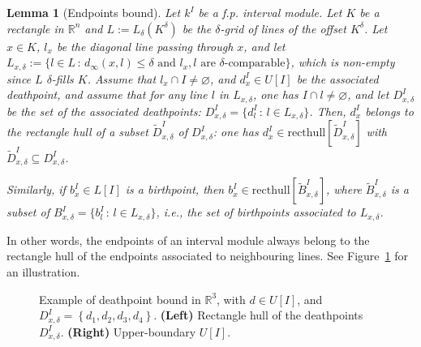 \documentclass{article}
\newcommand{\R}{\mathbb{R}}
\newcommand{\upperb}[1]{ U[#1] }
\newcommand{\lowerb}[1]{ L[#1] }
\newtheorem{lemma}[theorem]{Lemma}
\begin{document}
\begin{lemma}[Endpoints bound]\label{lemma:boundary_bound}
	Let $k^I$ be a {f.p.} interval module. Let $K$ be a rectangle in $\R^n$ and $L:=L_\delta(K^\delta)$ be the $\delta$-grid of lines of the offset $K^\delta$.
	Let $x\in K$, $l_x$ be the diagonal line passing through $x$, and let $
	L_{x,\delta}:=\{l\in L\,:\, d_\infty(x,l) \leq \delta \text{ and } l_x, l \text{ are $\delta$-comparable}\}
	$, which is non-empty since
	$L$ $\delta$-fills $K$.
	Assume that $l_x\cap I\neq \varnothing$, and $d^I_x \in \upperb{I}$ be the associated deathpoint, and
	assume that for any line $l$ in $L_{x,\delta}$, one has $I\cap l\neq \varnothing$, and
	let $D_{x,\delta}^I$ be the set of the associated deathpoints: $D_{x,\delta}^I=\{d_l^I\,:\, l\in L_{x,\delta}\}$.
	Then, $d^I_x$ belongs to the rectangle hull of a subset $\tilde
	D_{x,\delta}^I$ of $D_{x,\delta}^I$: one has $d^I_x\in \mathrm{recthull} [\tilde D_{x,\delta}^I]$ with $\tilde D_{x,\delta}^I \subseteq D_{x,\delta}^I$.

	Similarly, if $b^I_x\in \lowerb{I}$ is a birthpoint, then $b^I_x\in\mathrm{
	recthull}[\tilde B_{x,\delta}^I]$, where $\tilde B_{x,\delta}^I$ is a subset of $B_{x,\delta}^I=\{b_l^I\,:\, l\in L_{x,\delta}\}$, i.e., the set of birthpoints associated to $L_{x,\delta}$. \\
\end{lemma}

In other words, the endpoints of an interval module always belong to the rectangle hull of the endpoints associated to neighbouring lines.
See Figure~\ref{fig:boundary_bound} for an illustration.
\begin{figure}[H]
	\begin{center}
		
	\end{center}
	\caption{ Example of deathpoint bound in $\R^3$, with $d\in \upperb{I}$, and $D_{x,\delta}^I= \left\{d_1,d_2,d_3,d_4 \right\}$.
		\textbf{(Left)} Rectangle hull of the deathpoints $D_{x,\delta}^I$.
	\textbf{(Right)} Upper-boundary $\upperb{I}$.}
	\label{fig:boundary_bound}
\end{figure}
\end{document}

